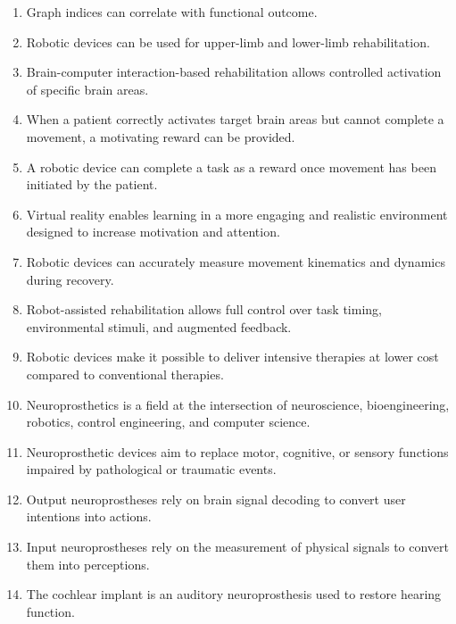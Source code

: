 \begin{enumerate}[label=\arabic*.]
    \item Graph indices can correlate with functional outcome.
    
    \item Robotic devices can be used for upper-limb and lower-limb rehabilitation.
    
    \item Brain-computer interaction-based rehabilitation allows controlled activation of specific brain areas.
    
    \item When a patient correctly activates target brain areas but cannot complete a movement, a motivating reward can be provided.
    
    \item A robotic device can complete a task as a reward once movement has been initiated by the patient.
    
    \item Virtual reality enables learning in a more engaging and realistic environment designed to increase motivation and attention.
    
    \item Robotic devices can accurately measure movement kinematics and dynamics during recovery.
    
    \item Robot-assisted rehabilitation allows full control over task timing, environmental stimuli, and augmented feedback.
    
    \item Robotic devices make it possible to deliver intensive therapies at lower cost compared to conventional therapies.
    
    \item Neuroprosthetics is a field at the intersection of neuroscience, bioengineering, robotics, control engineering, and computer science.
    
    \item Neuroprosthetic devices aim to replace motor, cognitive, or sensory functions impaired by pathological or traumatic events.
    
    \item Output neuroprostheses rely on brain signal decoding to convert user intentions into actions.
    
    \item Input neuroprostheses rely on the measurement of physical signals to convert them into perceptions.
    
    \item The cochlear implant is an auditory neuroprosthesis used to restore hearing function.
    

\end{enumerate}
